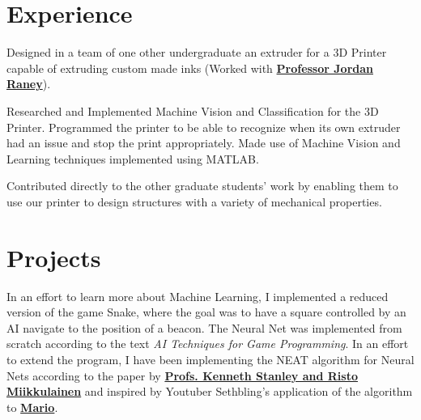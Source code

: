 \documentclass[]{deedy-resume-openfont}
\begin{document}
\hfill
\begin{minipage}[t]{0.66\textwidth}


\section{Experience}

\vspace{\topsep} %
\begin{tightemize}
\item Designed in a team of one other undergraduate an extruder for a 3D Printer capable of extruding custom made inks (Worked with \textbf{\href{raney@seas.upenn.edu}{ Professor Jordan Raney}}).
\item Researched and Implemented Machine Vision and Classification for the 3D Printer. Programmed the printer to be able to recognize when its own extruder had an issue and stop the print appropriately. Made use of Machine Vision and Learning techniques implemented using MATLAB.
\item Contributed directly to the other graduate students' work by enabling them to use our printer to design structures with a variety of mechanical properties.
\end{tightemize}

\sectionsep


\section{Projects}
In an effort to learn more about Machine Learning, I implemented a reduced version of the game Snake, where the goal was to have a square controlled by an AI navigate to the position of a beacon. The Neural Net was implemented from scratch according to the text \textit{AI Techniques for Game Programming}. In an effort to extend the program, I have been implementing the NEAT algorithm for Neural Nets according to the paper by \textbf{\href{http://nn.cs.utexas.edu/downloads/papers/stanley.ec02.pdf}{Profs. Kenneth Stanley and Risto Miikkulainen}} and inspired by Youtuber Sethbling's application of the algorithm to \textbf{\href{https://www.youtube.com/watch?v=qv6UVOQ0F44}{Mario}}.
\sectionsep
\\


\end{minipage}
\end{document}
